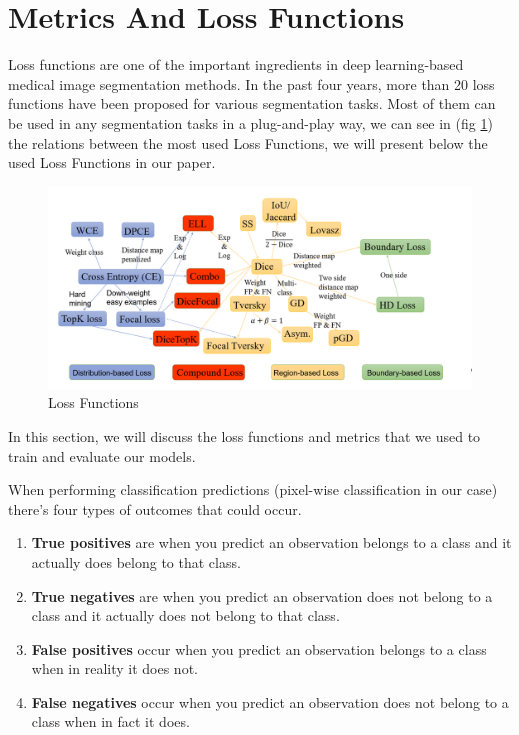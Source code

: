 \section{Metrics And Loss Functions}
Loss functions are one of the important ingredients in deep learning-based medical image segmentation methods. In the past four years, more than 20 loss functions have been proposed for various segmentation tasks. Most of them can be used in any segmentation tasks in a plug-and-play way, we can see in (fig \ref{fig:LossFunctions}) the relations between the most used  Loss Functions, we will present below the used Loss Functions in our paper.

\begin{figure}[H]
\centering
  \vspace{-0.1in}
    \centerline{\includegraphics[width = \linewidth]{../images/LossFunctions.png}}
    \caption{Loss Functions}
    \label{fig:LossFunctions}
\end{figure}

In this section, we will discuss the loss functions and metrics that we used to train and evaluate our models.

When performing classification predictions (pixel-wise classification in our case) there's four types of outcomes that could occur.

\begin{enumerate}
    \item \textbf{True positives} are when you predict an observation belongs to a class and it actually does belong to that class.
    \item \textbf{True negatives} are when you predict an observation does not belong to a class and it actually does not belong to that class.
    \item \textbf{False positives} occur when you predict an observation belongs to a class when in reality it does not.
    \item \textbf{False negatives} occur when you predict an observation does not belong to a class when in fact it does.
\end{enumerate}

